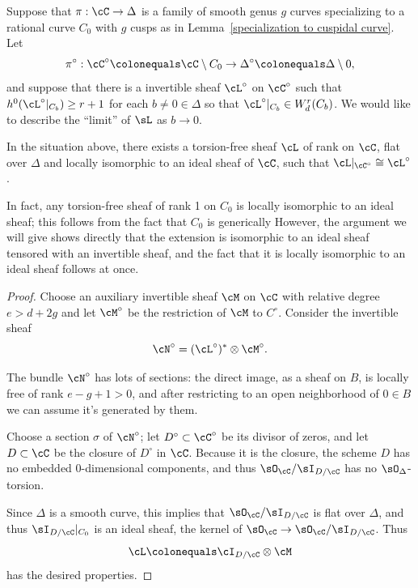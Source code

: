 Suppose  that  $\pi : \cC \to \Delta$ is a family of smooth genus $g$
%
curves specializing to a rational curve $C_0$ with $g$ cusps as in
Lemma~\ref{specialization to cuspidal curve}.
 Let
$$
\pi^\circ: \cC^\circ \colonequals  \cC \setminus C_0\to \Delta^\circ
\colonequals  \Delta\setminus 0,
$$
and suppose that there is a invertible sheaf $\cL^\circ$ on $\cC^\circ$
such that $h^0(\cL^\circ|_{C_b}) \geq r+1$ for each $b \neq 0 \in \Delta$
so that $\cL^\circ|_{C_b}\in W^{r}_{d}(C_{b})$. We would like to describe
the ``limit'' of $\sL$ as $b \to 0$.


\begin{lemma}\label{limit sheaf}
In the situation above, there exists a torsion-free sheaf $\cL$ of rank
%
\1 on $\cC$, flat over $\Delta$ and locally isomorphic to
an ideal sheaf of $\cC$, such that $\cL|_{\cC^\circ} \cong\nobreak \cL^\circ$.
\unif
\end{lemma}

In fact, any torsion-free sheaf of rank 1 on $C_{0}$ is locally isomorphic
to an ideal sheaf; this follows from the fact that $C_{0}$ is generically
%
However, the argument we will give
shows directly that the extension is isomorphic to an ideal sheaf tensored
with an invertible sheaf, and the fact that
it is locally isomorphic to an ideal sheaf follows at once.

\begin{proof} Choose an auxiliary invertible sheaf $\cM$ on $\cC$ with
relative degree $e > d + 2g$ and let $\cM^\circ$ be the restriction of
$\cM$ to $C^\circ$. Consider the invertible sheaf
$$
\cN^\circ = (\cL^\circ)^* \otimes \cM^\circ.
$$

The bundle $\cN^\circ$ has lots of sections: the direct image, as a sheaf
on $B$, is locally free of rank $e-g+1 > 0$, and after restricting to
an open neighborhood of $0 \in B$ we can assume it's generated by them.

Choose a section $\sigma$ of $\cN^\circ$; let $D^\circ \subset \cC^\circ$
be its divisor of zeros, and let $D \subset \cC$ be the closure of
$D^\circ$ in $\cC$. Because it is the closure, the scheme $D$ has
no embedded
0-dimensional components, and thus $\sO_{\cC}/\sI_{D/\cC}$ has no
$\sO_{\Delta}$-torsion.

Since $\Delta$ is a smooth
curve, this implies that $\sO_{\cC}/\sI_{D/\cC}$ is flat over $\Delta$,
and thus $\sI_{D/\cC}|_{C_{0}}$
is an ideal sheaf, the kernel of $\sO_{\cC} \to
\sO_{\cC}/\sI_{D/\cC}$. Thus
$$
\cL \colonequals  \cI_{D/\cC} \otimes \cM
$$
has the desired properties.
\unif
\end{proof}

